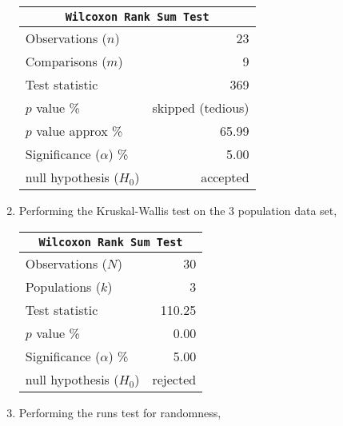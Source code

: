 \begin{enumerate}
	\begin{table}[H]
		\centering
		\begin{tabular}{@{}lr@{}}
			\toprule
			\multicolumn{2}{c}{\texttt{Wilcoxon Rank Sum Test}} \\
			\midrule
			Observations ($n$)         &        23 \\
			Comparisons ($m$)          &         9 \\
			Test statistic             &       369 \\
			$p$ value \%               &  skipped (tedious) \\
			$p$ value approx \%        &     65.99 \\
			Significance ($\alpha$) \% &      5.00 \\
			null hypothesis ($H_0$)    &  accepted \\
			\bottomrule
		\end{tabular}
		
	\end{table}
	\bigskip
	
	\item Performing the Kruskal-Wallis test on the 3 population data set,
	
	\begin{table}[H]
		\centering
		\begin{tabular}{@{}lr@{}}
			\toprule
			\multicolumn{2}{c}{\texttt{Wilcoxon Rank Sum Test}} \\
			\midrule
			Observations ($N$)         &        30 \\
			Populations ($k$)          &         3 \\
			Test statistic             &    110.25 \\
			$p$ value \%               &      0.00 \\
			Significance ($\alpha$) \% &      5.00 \\
			null hypothesis ($H_0$)    &  rejected \\
			\bottomrule
		\end{tabular}
		
	\end{table}
	\bigskip
	
	\item Performing the runs test for randomness,
	

\end{enumerate}
